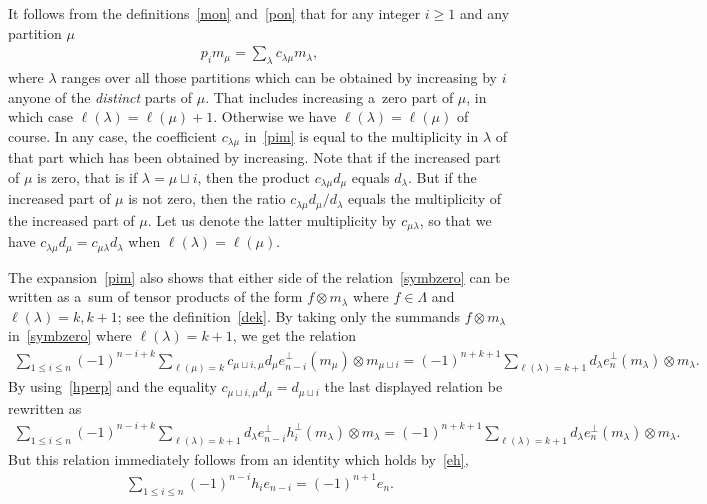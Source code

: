 \documentclass[11pt]{article}
\numberwithin{equation}{section}
\renewcommand\ge{\geqslant}
\renewcommand\le{\leqslant}
\begin{document}
It follows from the def\/initions~\eqref{mon} and~\eqref{pon} that for any integer $i\ge1$ and any
partition $\mu$
\begin{gather}\label{pim}
p_im_\mu=\sum_\lambda c_{\lambda\mu}m_\lambda,
\end{gather}
where $\lambda$ ranges over all those partitions which can be obtained by increasing by $i$ anyone of the
\emph{distinct} parts of $\mu$.
That includes increasing a~zero part of $\mu$, in which case $\ell(\lambda)=\ell(\mu)+1$.
Otherwise we have $\ell(\lambda)=\ell(\mu)$ of course.
In any case, the coef\/f\/icient $c_{\lambda\mu}$ in~\eqref{pim} is equal to the
multiplicity in $\lambda$ of that part which has been obtained by increasing.
Note that if the increased part of $\mu$ is zero, that is if $\lambda=\mu\sqcup i$, then
the product $c_{\lambda\mu}d_\mu$ equals $d_\lambda$.
But if the increased part of $\mu$ is not zero, then the ratio $
c_{\lambda\mu}d_\mu/ d_\lambda $ equals the multiplicity of
the increased part of $\mu$.
Let us denote the latter multiplicity by $c_{\mu\lambda}$, so that we have
$c_{\lambda\mu}d_\mu=c_{\mu\lambda}d_\lambda$ when
$\ell(\lambda)=\ell(\mu)$.

The expansion~\eqref{pim} also shows that either side of the relation~\eqref{symbzero} can be written as
a~sum of tensor products of the form $f\otimes m_\lambda$ where $f\in\Lambda$ and $\ell(\lambda)=k,k+1$;
see the def\/inition~\eqref{dek}.
By taking only the summands $f\otimes m_\lambda$ in~\eqref{symbzero} where
$\ell(\lambda)=k+1$, we get the relation
\begin{gather*}
\sum_{1\le i\le n}(-1)^{n-i+k}\sum_{\ell(\mu)=k}c_{\mu
\sqcup i,\mu}d_\mu e_{n-i}^{\perp}(m_\mu)\otimes m_{\mu\sqcup i}
=(-1)^{n+k+1}\sum_{\ell(\lambda)=k+1}d_\lambda e_n^{\perp}(m_\lambda)\otimes m_\lambda.
\end{gather*}
By using~\eqref{hperp} and the equality $ c_{\mu\sqcup
i,\mu}d_\mu=d_{\mu\sqcup i}
$ the last displayed relation be rewritten as
\begin{gather*}
\sum_{1\le i\le n}(-1)^{n-i+k}\sum_{\ell(\lambda)=k+1}d_\lambda e_{n-i}
^{\perp}h_i^{\perp}(
m_\lambda)\otimes m_\lambda=(-1)^{n+k+1}\sum_{\ell(\lambda)=k+1}
d_\lambda e_n^{\perp}(m_\lambda)\otimes m_\lambda.
\end{gather*}
But this relation immediately follows from an identity which holds by~\eqref{eh},
\begin{gather*}
\sum_{1\le i\le n}(-1)^{n-i}h_ie_{n-i}=(-1)^{n+1}e_n.
\end{gather*}
\end{document}
